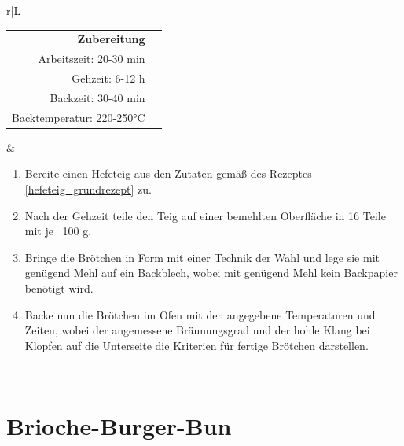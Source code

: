 \documentclass[a4paper, 12pt]{scrbook} 								%
\numberwithin{equation}{section} 									%
\begin{document}
\begin{tabularx}{\textwidth}{r|L}
		\begin{tabular}[t]{rr}
			\textbf{Zubereitung}	\\
			Arbeitszeit: 20-30 min	\\
			Gehzeit: 6-12 h			\\
			Backzeit: 30-40 min		\\
			Backtemperatur: 220-250°C \\
		\end{tabular}			&	\begin{enumerate}[]
										\item Bereite einen Hefeteig aus den Zutaten gemäß des Rezeptes \ref{hefeteig_grundrezept} zu.
										\item Nach der Gehzeit teile den Teig auf einer bemehlten Oberfläche in 16 Teile mit je ~100 g.
										\item Bringe die Brötchen in Form mit einer Technik der Wahl und lege sie mit genügend Mehl auf ein Backblech, wobei mit genügend Mehl kein Backpapier benötigt wird.
										\item Backe nun die Brötchen im Ofen mit den angegebene Temperaturen und Zeiten, wobei der angemessene Bräunungsgrad und der hohle Klang bei Klopfen auf die Unterseite die Kriterien für fertige Brötchen darstellen.
									\end{enumerate}	\\
		\end{tabularx}

		\newpage

		\section{Brioche-Burger-Bun}	\label{brioche_burger_bun}
\end{document}
